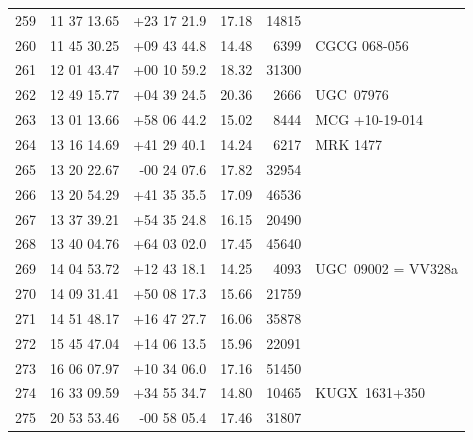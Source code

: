 \documentclass[useAMS,usenatbib]{mn2e}
\begin{document}
\begin{table}
\begin{tabular}{rrrlrl}
 259 &  11 37 13.65 & +23 17 21.9 &  17.18 &  14815 &                  \\
 260 &  11 45 30.25 & +09 43 44.8 &  14.48 &   6399 &    CGCG 068-056  \\
 261 &  12 01 43.47 & +00 10 59.2 &  18.32 &  31300 &                  \\
 262 &  12 49 15.77 & +04 39 24.5 &  20.36 &   2666 &       UGC~07976  \\
 263 &  13 01 13.66 & +58 06 44.2 &  15.02 &   8444 &  MCG +10-19-014  \\
 264 &  13 16 14.69 & +41 29 40.1 &  14.24 &   6217 &        MRK 1477  \\
 265 &  13 20 22.67 & -00 24 07.6 &  17.82 &  32954 &                  \\
 266 &  13 20 54.29 & +41 35 35.5 &  17.09 &  46536 &                  \\
 267 &  13 37 39.21 & +54 35 24.8 &  16.15 &  20490 &                  \\
 268 &  13 40 04.76 & +64 03 02.0 &  17.45 &  45640 &                  \\
 269 &  14 04 53.72 & +12 43 18.1 &  14.25 &   4093 &UGC~09002 = VV328a\\
 270 &  14 09 31.41 & +50 08 17.3 &  15.66 &  21759 &                  \\
 271 &  14 51 48.17 & +16 47 27.7 &  16.06 &  35878 &                  \\
 272 &  15 45 47.04 & +14 06 13.5 &  15.96 &  22091 &                  \\
 273 &  16 06 07.97 & +10 34 06.0 &  17.16 &  51450 &                  \\
 274 &  16 33 09.59 & +34 55 34.7 &  14.80 &  10465 &    KUGX~1631+350 \\
 275 &  20 53 53.46 & -00 58 05.4 &  17.46 &  31807 &                  \\
\hline
\end{tabular}
\end{table}









\label{lastpage}
\end{document}
